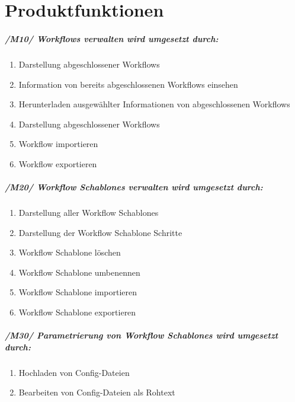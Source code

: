 \chapter{Produktfunktionen}

\paragraph{/M10/ \textit{\glspl{Workflow} verwalten} wird umgesetzt durch:}


\renewcommand{\labelenumi}{/FA\arabic{enumi}0/}
\begin{enumerate}
    \setlength\itemsep{-1em}    
    \item Darstellung abgeschlossener \glspl{Workflow}
    \item Information von bereits abgeschlossenen \glspl{Workflow} einsehen
    \item Herunterladen ausgewählter Informationen von abgeschlossenen \glspl{Workflow}
    \item Darstellung abgeschlossener \glspl{Workflow}
    \item \gls{Workflow} importieren
    \item \gls{Workflow} exportieren
    \setcounter{FAs}{\value{enumi}}
\end{enumerate}

\paragraph{/M20/ \textit{\glspl{Workflow Schablone} verwalten} wird umgesetzt durch:}
\begin{enumerate}
    \setlength\itemsep{-1em}
    \setcounter{enumi}{\value{FAs}}
    \item Darstellung aller \glspl{Workflow Schablone}
    \item Darstellung der \gls{Workflow Schablone} Schritte
    \item \gls{Workflow Schablone} löschen
    \item \gls{Workflow Schablone} umbenennen
        \item \gls{Workflow Schablone} importieren
    \item \gls{Workflow Schablone} exportieren
    \setcounter{FAs}{\value{enumi}}
\end{enumerate}

\paragraph{/M30/ \textit{Parametrierung von \glspl{Workflow Schablone}} wird umgesetzt durch:}
\begin{enumerate}
    \setlength\itemsep{-1em}
    \setcounter{enumi}{\value{FAs}}
    \item Hochladen von Config-Dateien
    \item Bearbeiten von Config-Dateien als Rohtext
    \setcounter{FAs}{\value{enumi}}
\end{enumerate}

